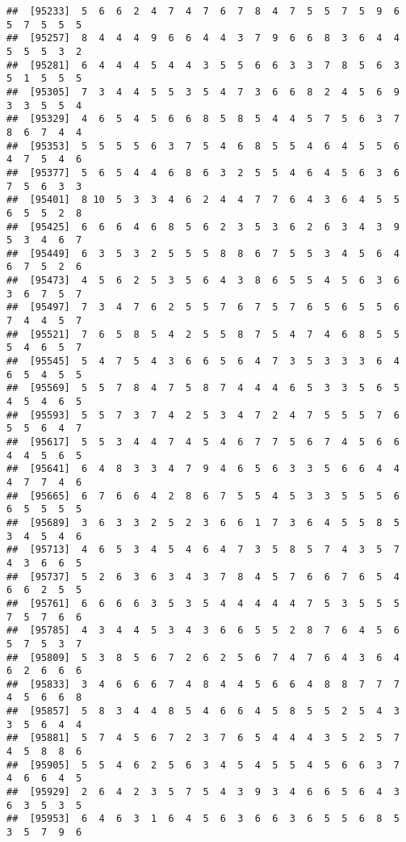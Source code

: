 \documentclass[
]{book}
\begin{document}
\begin{verbatim}
##  [95233]  5  6  6  2  4  7  4  7  6  7  8  4  7  5  5  7  5  9  6  5  7  5  5  5
##  [95257]  8  4  4  4  9  6  6  4  4  3  7  9  6  6  8  3  6  4  4  5  5  5  3  2
##  [95281]  6  4  4  4  5  4  4  3  5  5  6  6  3  3  7  8  5  6  3  5  1  5  5  5
##  [95305]  7  3  4  4  5  5  3  5  4  7  3  6  6  8  2  4  5  6  9  3  3  5  5  4
##  [95329]  4  6  5  4  5  6  6  8  5  8  5  4  4  5  7  5  6  3  7  8  6  7  4  4
##  [95353]  5  5  5  5  6  3  7  5  4  6  8  5  5  4  6  4  5  5  6  4  7  5  4  6
##  [95377]  5  6  5  4  4  6  8  6  3  2  5  5  4  6  4  5  6  3  6  7  5  6  3  3
##  [95401]  8 10  5  3  3  4  6  2  4  4  7  7  6  4  3  6  4  5  5  6  5  5  2  8
##  [95425]  6  6  6  4  6  8  5  6  2  3  5  3  6  2  6  3  4  3  9  5  3  4  6  7
##  [95449]  6  3  5  3  2  5  5  5  8  8  6  7  5  5  3  4  5  6  4  6  7  5  2  6
##  [95473]  4  5  6  2  5  3  5  6  4  3  8  6  5  5  4  5  6  3  6  3  6  7  5  7
##  [95497]  7  3  4  7  6  2  5  5  7  6  7  5  7  6  5  6  5  5  6  7  4  4  5  7
##  [95521]  7  6  5  8  5  4  2  5  5  8  7  5  4  7  4  6  8  5  5  5  4  6  5  7
##  [95545]  5  4  7  5  4  3  6  6  5  6  4  7  3  5  3  3  3  6  4  6  5  4  5  5
##  [95569]  5  5  7  8  4  7  5  8  7  4  4  4  6  5  3  3  5  6  5  4  5  4  6  5
##  [95593]  5  5  7  3  7  4  2  5  3  4  7  2  4  7  5  5  5  7  6  5  5  6  4  7
##  [95617]  5  5  3  4  4  7  4  5  4  6  7  7  5  6  7  4  5  6  6  4  4  5  6  5
##  [95641]  6  4  8  3  3  4  7  9  4  6  5  6  3  3  5  6  6  4  4  4  7  7  4  6
##  [95665]  6  7  6  6  4  2  8  6  7  5  5  4  5  3  3  5  5  5  6  6  5  5  5  5
##  [95689]  3  6  3  3  2  5  2  3  6  6  1  7  3  6  4  5  5  8  5  3  4  5  4  6
##  [95713]  4  6  5  3  4  5  4  6  4  7  3  5  8  5  7  4  3  5  7  4  3  6  6  5
##  [95737]  5  2  6  3  6  3  4  3  7  8  4  5  7  6  6  7  6  5  4  6  6  2  5  5
##  [95761]  6  6  6  6  3  5  3  5  4  4  4  4  4  7  5  3  5  5  5  7  5  7  6  6
##  [95785]  4  3  4  4  5  3  4  3  6  6  5  5  2  8  7  6  4  5  6  5  7  5  3  7
##  [95809]  5  3  8  5  6  7  2  6  2  5  6  7  4  7  6  4  3  6  4  6  2  6  6  6
##  [95833]  3  4  6  6  6  7  4  8  4  4  5  6  6  4  8  8  7  7  7  4  5  6  6  8
##  [95857]  5  8  3  4  4  8  5  4  6  6  4  5  8  5  5  2  5  4  3  3  5  6  4  4
##  [95881]  5  7  4  5  6  7  2  3  7  6  5  4  4  4  3  5  2  5  7  4  5  8  8  6
##  [95905]  5  5  4  6  2  5  6  3  4  5  4  5  5  4  5  6  6  3  7  4  6  6  4  5
##  [95929]  2  6  4  2  3  5  7  5  4  3  9  3  4  6  6  5  6  4  3  6  3  5  3  5
##  [95953]  6  4  6  3  1  6  4  5  6  3  6  6  3  6  5  5  6  8  5  3  5  7  9  6

\end{verbatim}
\end{document}
